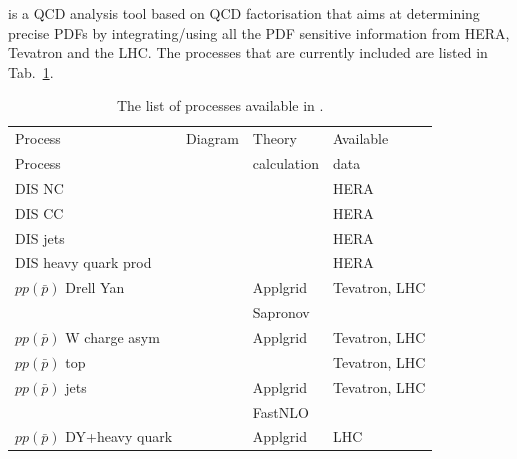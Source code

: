\fitter is a QCD analysis tool based on QCD factorisation that aims at 
determining precise PDFs by integrating/using all the PDF sensitive information
from HERA, Tevatron and the LHC.
%
The processes that are currently included are listed in Tab.~\ref{tab:proc}.
%
\begin{table}
\begin{tabular}{|l|l|l|l|}
\hline
Process &  Diagram & Theory      & Available \\
Process &          & calculation &  data\\
\hline
DIS NC   & & & HERA \\
DIS CC   & & & HERA \\
DIS jets & & & HERA\\
DIS heavy quark prod & & & HERA \\
\hline
$pp(\bar p)$ Drell Yan & & Applgrid & Tevatron, LHC \\
                       & & Sapronov  &  \\
$pp(\bar p)$ W charge asym & & Applgrid & Tevatron, LHC \\
$pp(\bar p)$ top & & & Tevatron, LHC \\
$pp(\bar p)$ jets & & Applgrid & Tevatron, LHC \\
                  & & FastNLO  &  \\
$pp(\bar p)$ DY+heavy quark & & Applgrid & LHC \\
\hline
\end{tabular}
\caption{The list of processes available in \fitter.}
\label{tab:proc}
\end{table}
%

